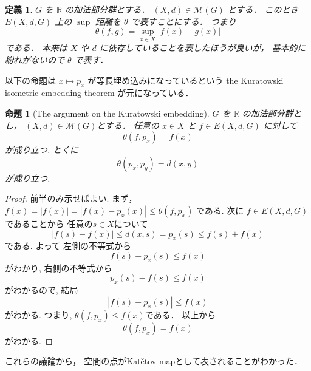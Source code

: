\documentclass[leqno, 12pt]{jsarticle}
\newtheorem{prop}[thm]{命題}
\newtheorem{df}[thm]{定義}
\newcommand{\rr}{\mathbb{R}}
\begin{document}
\begin{df}\label{df:katetov:supmetric}
$G$
を
$\rr$
の加法部分群とする．
$(X, d)\in \mathscr{M}(G)$
とする．
このとき
$E(X, d, G)$
上の
$\sup$
距離を
$\theta$
で表すことにする．
つまり
\[
\theta(f, g)=\sup_{x\in X}|f(x)-g(x)|
\]
である．
本来は
$X$
や
$d$
に依存していることを表したほうが良いが，
基本的に紛れがないので
$\theta$
で表す．
\end{df}


以下の命題は
$x\mapsto p_{x}$
が等長埋め込みになっているという
the 
Kuratowski isometric embedding theorem 
が元になっている．

\begin{prop}[The argument on the Kuratowski embedding]\label{prop:katetov:Kuratowski}
$G$
を
$\rr$
の加法部分群とし，
$(X, d)\in \mathscr{M}(G)$とする．
任意の
$x\in X$
と
$f\in E(X, d, G)$
に対して
\[
\theta(f, p_x)=f(x)
\]
が成り立つ.
とくに
\[
\theta(p_{x}, p_{y})=d(x, y)
\]
が成り立つ.
\end{prop}
\begin{proof}
前半のみ示せばよい.
まず，
$f(x)=|f(x)|=|f(x)-p_{x}(x)|\le \theta(f, p_{x})$
である.
次に
$f\in E(X, d, G)$であることから
任意の$s\in X$について
\[
|f(s)-f(x)|\le d(x, s)=p_x(s)\le f(s)+f(x)
\]
である.
よって
左側の不等式から
\[
f(s)-p_{x}(s)\le f(x)
\]
がわかり,
右側の不等式から
\[
p_{x}(s)-f(s)\le f(x)
\]
がわかるので, 
結局
\[
|f(s)-p_{x}(s)|\le f(x)
\]
がわかる. 
つまり, 
$\theta(f, p_{x})\le f(x)$である．
以上から
\[
\theta(f, p_{x})=f(x)
\]
がわかる.
\end{proof}
これらの議論から，
空間の点がKat\v{e}tov mapとして表されることがわかった．
\end{document}
